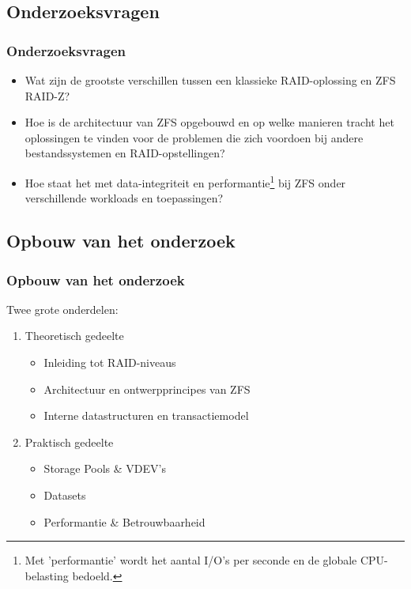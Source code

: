 \documentclass{beamer}
\begin{document}

\subsection{Onderzoeksvragen}


\begin{frame}
  \frametitle{Onderzoeksvragen}
  \begin{itemize}
	  \item Wat zijn de grootste verschillen tussen een klassieke RAID-oplossing en ZFS RAID-Z?
	  \item Hoe is de architectuur van ZFS opgebouwd en op welke manieren tracht het oplossingen te vinden voor de problemen die zich voordoen bij andere bestandssystemen en RAID-opstellingen?
    \item Hoe staat het met data-integriteit en performantie\footnote{Met 'performantie' wordt het aantal I/O's per seconde en de globale CPU-belasting bedoeld.} bij ZFS onder verschillende workloads en toepassingen?
  \end{itemize}
\end{frame}


\subsection{Opbouw van het onderzoek}


\begin{frame}
\frametitle{Opbouw van het onderzoek}

Twee grote onderdelen:
  \begin{enumerate}
    \item Theoretisch gedeelte
      \begin{itemize}
        \item Inleiding tot RAID-niveaus
        \item Architectuur en ontwerpprincipes van ZFS
        \item Interne datastructuren en transactiemodel
      \end{itemize}
    \item{Praktisch gedeelte}
      \begin{itemize}
        \item Storage Pools \& VDEV's
        \item Datasets
        \item Performantie \& Betrouwbaarheid
      \end{itemize}
  \end{enumerate}
\end{frame}
\end{document}
